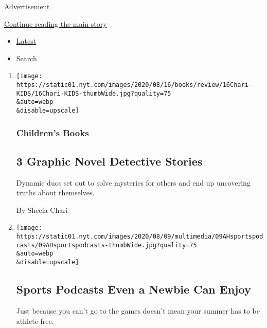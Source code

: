 Advertisement

\protect\hyperlink{after-mid1}{Continue reading the main story}

\begin{itemize}
\tightlist
\item
  \protect\hyperlink{stream-panel}{Latest}
\item
  Search
\end{itemize}

\begin{enumerate}
\def\labelenumi{\arabic{enumi}.}
\item
  \href{/2020/08/08/books/review/drew-dernavich-elvin-link-please-report-to-the-principals-office.html}{}

  \texttt{[image: https://static01.nyt.com/images/2020/08/16/books/review/16Chari-KIDS/16Chari-KIDS-thumbWide.jpg?quality=75\\\&auto=webp\\\&disable=upscale]}

  \hypertarget{childrens-books}{%
  \subsubsection{Children's Books}\label{childrens-books}}

  \hypertarget{3-graphic-novel-detective-stories}{%
  \subsection{3 Graphic Novel Detective
  Stories}\label{3-graphic-novel-detective-stories}}

  Dynamic duos set out to solve mysteries for others and end up
  uncovering truths about themselves.

  By Sheela Chari
\item
  \href{/2020/08/08/at-home/coronavirus-sports-podcasts.html}{}

  \texttt{[image: https://static01.nyt.com/images/2020/08/09/multimedia/09AHsportspodcasts/09AHsportspodcasts-thumbWide.jpg?quality=75\\\&auto=webp\\\&disable=upscale]}

  \hypertarget{sports-podcasts-even-a-newbie-can-enjoy}{%
  \subsection{Sports Podcasts Even a Newbie Can
  Enjoy}\label{sports-podcasts-even-a-newbie-can-enjoy}}

  Just because you can't go to the games doesn't mean your summer has to
  be athlete-free.


\end{enumerate}
